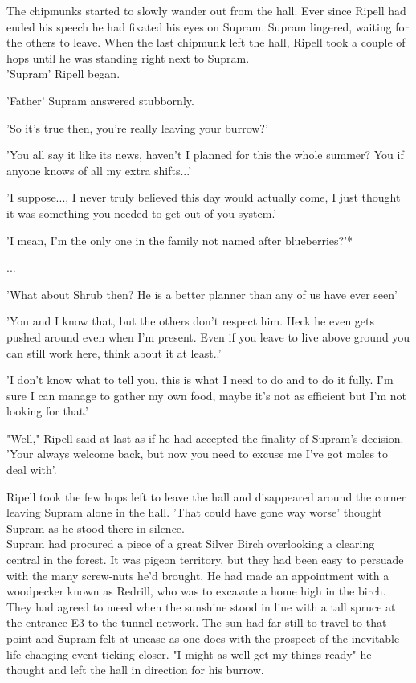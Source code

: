 \documentclass[smalldemyvopaper,11pt,twoside,onecolumn,openright,extrafontsizes]{memoir}
\begin{document}
The chipmunks started to slowly wander out from the hall. Ever since Ripell had ended his speech he had fixated his eyes on Supram. Supram lingered, waiting for the others to leave. When the last chipmunk left the hall, Ripell took a couple of hops until he was standing right next to Supram.\\

'Supram' Ripell began.

'Father' Supram answered stubbornly.

'So it's true then, you're really leaving your burrow?'

'You all say it like its news, haven't I planned for this the whole summer? You if anyone knows of all my extra shifts...'

'I suppose..., I never truly believed this day would actually come, I just thought it was something you needed to get out of you system.'

'I mean, I'm the only one in the family not named after blueberries?'*

...

'What about Shrub then? He is a better planner than any of us have ever seen'

'You and I know that, but the others don't respect him. Heck he even gets pushed around even when I'm present.
Even if you leave to live above ground you can still work here, think about it at least..'

'I don't know what to tell you, this is what I need to do and to do it fully. I'm sure I can manage to gather my own food, maybe it's not as efficient but I'm not looking for that.'

"Well," Ripell said at last as if he had accepted the finality of Supram's decision. 'Your always welcome back, but now you need to excuse me I've got moles to deal with'.

Ripell took the few hops left to leave the hall and disappeared around the corner leaving Supram alone in the hall. 'That could have gone way worse' thought Supram as he stood there in silence. \\

Supram had procured a piece of a great Silver Birch overlooking a clearing central in the forest. It was pigeon territory, but they had been easy to persuade with the many screw-nuts he'd brought. He had made an appointment with a woodpecker known as Redrill, who was to excavate a home high in the birch. They had agreed to meed when the sunshine stood in line with a tall spruce at the entrance E3 to the tunnel network. The sun had far still to travel to that point and Supram felt at unease as one does with the prospect of the inevitable life changing event ticking closer. "I might as well get my things ready" he thought and left the hall in direction for his burrow.\\
\end{document}
